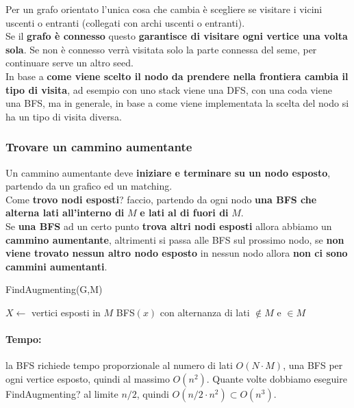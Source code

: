 Per un grafo orientato l'unica cosa che cambia è scegliere se visitare i vicini uscenti o entranti (collegati con archi uscenti o entranti).\\

Se il \textbf{grafo è connesso} questo \textbf{garantisce di visitare ogni vertice una volta sola}. Se non è connesso verrà visitata solo la parte connessa del seme, per continuare serve un altro seed.\\

In base a \textbf{come viene scelto il nodo da prendere nella frontiera cambia il tipo di visita}, ad esempio con uno stack viene una DFS, con una coda viene una BFS, ma in generale, in base a come viene implementata la scelta del nodo si ha un tipo di visita diversa.\\

\newpage

\subsubsection{Trovare un cammino aumentante}
Un cammino aumentante deve \textbf{iniziare e terminare su un nodo esposto}, partendo da un grafico ed un matching. \\

Come \textbf{trovo nodi esposti}? faccio, partendo da ogni nodo \textbf{una BFS che alterna lati all'interno di} $M$ \textbf{e lati al di fuori di} $M$.\\

Se \textbf{una BFS} ad un certo punto \textbf{trova altri nodi esposti} allora abbiamo un \textbf{cammino aumentante}, altrimenti si passa alle BFS sul prossimo nodo, se \textbf{non viene trovato nessun altro nodo esposto} in nessun nodo allora \textbf{non ci sono cammini aumentanti}.\\

\begin{algorithm}
	\caption{FindAugmenting(G,M)}
	\begin{algorithmic}
		\STATE $X \leftarrow$ vertici esposti in $M$
		\STATE  BFS$(x)$ con alternanza di lati $\notin M$ e $\in M$
		\ENDFOR
	\end{algorithmic}
\end{algorithm}

\paragraph{Tempo:} la BFS richiede tempo proporzionale al numero di lati $O(N \cdot M)$, una BFS per ogni vertice esposto, quindi al massimo $O(n^2)$. Quante volte dobbiamo eseguire FindAugmenting? al limite $n/2$, quindi $O(n/2 \cdot n^2) \subset O(n^3)$.\\

